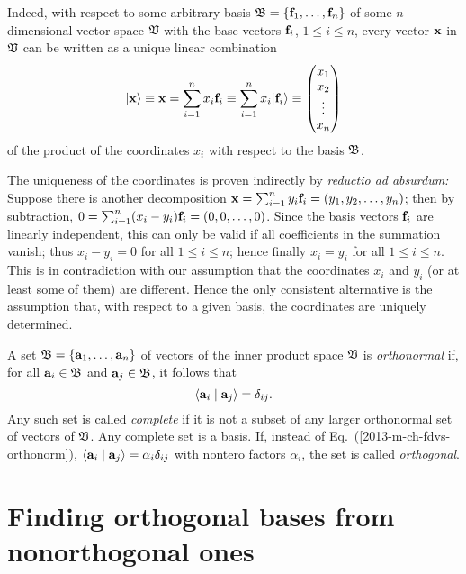 Indeed, with respect to some arbitrary  basis ${\frak B}=\{
{\bf f}_1, \ldots , {\bf f}_n\}$ of some $n$-dimensional vector space ${\frak V}$
with the base vectors ${\bf f}_i$, $1\le i\le n$, every vector ${\bf x}$ in  ${\frak V}$
can be written as a unique linear combination
\begin{equation}
 \vert {\bf x} \rangle \equiv {\bf x} = \sum_{i=1}^n x_i{\bf f}_i
\equiv
\sum_{i=1}^n x_i \vert {\bf f}_i \rangle
\equiv \begin{pmatrix} x_1\\x_2\\ \vdots \\ x_n \end{pmatrix}
\end{equation}
of the product of the coordinates $x_i$ with respect to the basis  ${\frak B}$.

{\color{OliveGreen}
\bproof
The uniqueness of the coordinates is proven indirectly by {\em reductio ad absurdum:}
Suppose there is another decomposition
${\bf x} = \sum_{i=1}^n y_i{\bf f}_i = (y_1,y_2, \ldots , y_n) $;
then by subtraction, $0 = \sum_{i=1}^n (x_i-y_i) {\bf f}_i = (0,0, \ldots , 0)$.
Since the basis vectors ${\bf f}_i$ are linearly independent,
this can only be valid if all coefficients in the summation  vanish;
thus $x_i-y_i=0$ for all $1\le i\le n$; hence finally  $x_i=y_i$ for all $1\le i\le n$.
This is in contradiction with our assumption that the coordinates $x_i$ and $y_i$
(or at least some of them) are different.
Hence the only consistent alternative is the assumption that, with respect to a given basis, the coordinates are uniquely determined.
\eproof
}

A  set    $\frak B = \{
{\bf a}_1, \ldots , {\bf a}_n\}$
of  vectors   of the inner product space $\frak V$
is {\em orthonormal}
if, for all
 ${\bf a}_i\in\frak B$ and
 ${\bf a}_j\in\frak B$,
it follows that
\begin{equation}
\langle {\bf a}_i \mid {\bf a}_j \rangle =\delta_{ij}.
\label{2013-m-ch-fdvs-orthonorm}
\end{equation}
Any such set is called {\em complete}
if it is not a subset of any larger orthonormal set of vectors of $\frak V$.
Any complete set is a basis.
If, instead of Eq.~(\ref{2013-m-ch-fdvs-orthonorm}),
$\langle {\bf a}_i \mid {\bf a}_j \rangle = \alpha_i \delta_{ij}$
with nontero factors $\alpha_i$, the set is called {\em orthogonal}.


\section{Finding orthogonal bases from nonorthogonal ones}

